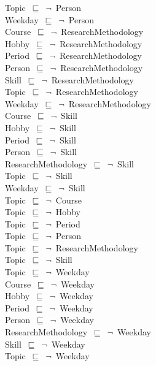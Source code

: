 \documentclass{article}
\begin{document}
Topic~\ensuremath{\sqsubseteq}~\ensuremath{\lnot}~Person\\
Weekday~\ensuremath{\sqsubseteq}~\ensuremath{\lnot}~Person\\
Course~\ensuremath{\sqsubseteq}~\ensuremath{\lnot}~ResearchMethodology\\
Hobby~\ensuremath{\sqsubseteq}~\ensuremath{\lnot}~ResearchMethodology\\
Period~\ensuremath{\sqsubseteq}~\ensuremath{\lnot}~ResearchMethodology\\
Person~\ensuremath{\sqsubseteq}~\ensuremath{\lnot}~ResearchMethodology\\
Skill~\ensuremath{\sqsubseteq}~\ensuremath{\lnot}~ResearchMethodology\\
Topic~\ensuremath{\sqsubseteq}~\ensuremath{\lnot}~ResearchMethodology\\
Weekday~\ensuremath{\sqsubseteq}~\ensuremath{\lnot}~ResearchMethodology\\
Course~\ensuremath{\sqsubseteq}~\ensuremath{\lnot}~Skill\\
Hobby~\ensuremath{\sqsubseteq}~\ensuremath{\lnot}~Skill\\
Period~\ensuremath{\sqsubseteq}~\ensuremath{\lnot}~Skill\\
Person~\ensuremath{\sqsubseteq}~\ensuremath{\lnot}~Skill\\
ResearchMethodology~\ensuremath{\sqsubseteq}~\ensuremath{\lnot}~Skill\\
Topic~\ensuremath{\sqsubseteq}~\ensuremath{\lnot}~Skill\\
Weekday~\ensuremath{\sqsubseteq}~\ensuremath{\lnot}~Skill\\
Topic~\ensuremath{\sqsubseteq}~\ensuremath{\lnot}~Course\\
Topic~\ensuremath{\sqsubseteq}~\ensuremath{\lnot}~Hobby\\
Topic~\ensuremath{\sqsubseteq}~\ensuremath{\lnot}~Period\\
Topic~\ensuremath{\sqsubseteq}~\ensuremath{\lnot}~Person\\
Topic~\ensuremath{\sqsubseteq}~\ensuremath{\lnot}~ResearchMethodology\\
Topic~\ensuremath{\sqsubseteq}~\ensuremath{\lnot}~Skill\\
Topic~\ensuremath{\sqsubseteq}~\ensuremath{\lnot}~Weekday\\
Course~\ensuremath{\sqsubseteq}~\ensuremath{\lnot}~Weekday\\
Hobby~\ensuremath{\sqsubseteq}~\ensuremath{\lnot}~Weekday\\
Period~\ensuremath{\sqsubseteq}~\ensuremath{\lnot}~Weekday\\
Person~\ensuremath{\sqsubseteq}~\ensuremath{\lnot}~Weekday\\
ResearchMethodology~\ensuremath{\sqsubseteq}~\ensuremath{\lnot}~Weekday\\
Skill~\ensuremath{\sqsubseteq}~\ensuremath{\lnot}~Weekday\\
Topic~\ensuremath{\sqsubseteq}~\ensuremath{\lnot}~Weekday\\
\end{document}
